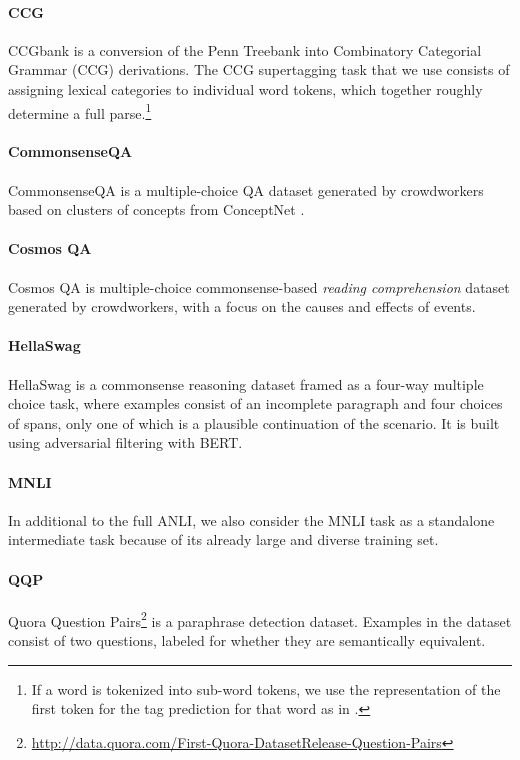 \documentclass[11pt,a4paper]{article}
\newcommand{\anli}{ANLI}
\begin{document}
\paragraph{CCG} CCGbank \citep{ccg} is a conversion of the Penn Treebank into Combinatory Categorial Grammar (CCG) derivations. The CCG supertagging task that we use consists of assigning lexical categories to individual word tokens, which together roughly determine a full parse.\footnote{If a word is tokenized into sub-word tokens, we use the representation of the first token for the tag prediction for that word as in \citet{devlin2019bert}.}

\paragraph{CommonsenseQA} CommonsenseQA \cite{commonsenseqa} is a multiple-choice QA dataset generated by crowdworkers based on clusters of concepts from ConceptNet \citep{conceptnet}.

\paragraph{Cosmos QA} Cosmos QA is multiple-choice commonsense-based \textit{reading comprehension} dataset \citep{cosmos} generated by crowdworkers, with a focus on the causes and effects of events.

\paragraph{HellaSwag} HellaSwag \citep{hellaswag} is a commonsense reasoning dataset framed as a four-way multiple choice task, where examples consist of an incomplete paragraph and four choices of spans, only one of which is a plausible continuation of the scenario. It is built using adversarial filtering \citep{zellers-etal-2018-swag, bras2020adversarial} with BERT.

\paragraph{MNLI} In additional to the full \anli, we also consider the MNLI task as a standalone intermediate task because of its already large and diverse training set.

\paragraph{QQP} Quora Question Pairs\footnote{\url{http://data.quora.com/First-Quora-DatasetRelease-Question-Pairs}\label{qqp-source}} is a paraphrase detection dataset. Examples in the dataset consist of two questions, labeled for whether they are semantically equivalent.
\end{document}
